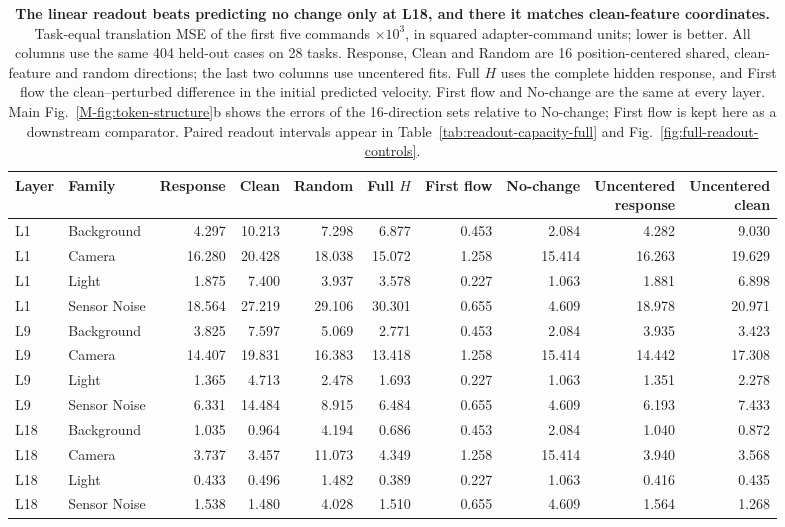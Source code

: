\begin{table}[ht]
\caption{\textbf{The linear readout beats predicting no change only at L18, and there it matches clean-feature coordinates.} Task-equal translation MSE of the first five commands $\times10^3$, in squared adapter-command units; lower is better. All columns use the same 404 held-out cases on 28 tasks. Response, Clean and Random are 16 position-centered shared, clean-feature and random directions; the last two columns use uncentered fits. Full $H$ uses the complete hidden response, and First flow the clean--perturbed difference in the initial predicted velocity. First flow and No-change are the same at every layer. Main Fig.~\ref*{M-fig:token-structure}b shows the errors of the 16-direction sets relative to No-change; First flow is kept here as a downstream comparator. Paired readout intervals appear in Table~\ref{tab:readout-capacity-full} and Fig.~\ref{fig:full-readout-controls}.}
\centering\small
\setlength{\tabcolsep}{3.3pt}
\begin{tabular}{llrrrrrrrr}\toprule
Layer & Family & Response & Clean & Random & Full $H$ & First flow & No-change & \shortstack{Uncentered\\response} & \shortstack{Uncentered\\clean}\\\midrule
L1 & Background & 4.297 & 10.213 & 7.298 & 6.877 & 0.453 & 2.084 & 4.282 & 9.030\\
L1 & Camera & 16.280 & 20.428 & 18.038 & 15.072 & 1.258 & 15.414 & 16.263 & 19.629\\
L1 & Light & 1.875 & 7.400 & 3.937 & 3.578 & 0.227 & 1.063 & 1.881 & 6.898\\
L1 & Sensor Noise & 18.564 & 27.219 & 29.106 & 30.301 & 0.655 & 4.609 & 18.978 & 20.971\\
\midrule
L9 & Background & 3.825 & 7.597 & 5.069 & 2.771 & 0.453 & 2.084 & 3.935 & 3.423\\
L9 & Camera & 14.407 & 19.831 & 16.383 & 13.418 & 1.258 & 15.414 & 14.442 & 17.308\\
L9 & Light & 1.365 & 4.713 & 2.478 & 1.693 & 0.227 & 1.063 & 1.351 & 2.278\\
L9 & Sensor Noise & 6.331 & 14.484 & 8.915 & 6.484 & 0.655 & 4.609 & 6.193 & 7.433\\
\midrule
L18 & Background & 1.035 & 0.964 & 4.194 & 0.686 & 0.453 & 2.084 & 1.040 & 0.872\\
L18 & Camera & 3.737 & 3.457 & 11.073 & 4.349 & 1.258 & 15.414 & 3.940 & 3.568\\
L18 & Light & 0.433 & 0.496 & 1.482 & 0.389 & 0.227 & 1.063 & 0.416 & 0.435\\
L18 & Sensor Noise & 1.538 & 1.480 & 4.028 & 1.510 & 0.655 & 4.609 & 1.564 & 1.268\\
\bottomrule\end{tabular}

\label{tab:current-basis-control}
\end{table}
